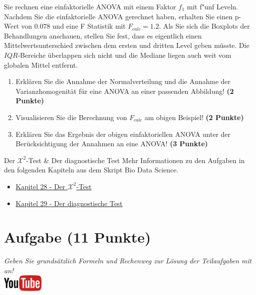 \documentclass[a4paper, 10pt]{scrartcl}\usepackage[]{graphicx}\usepackage[]{xcolor}
\begin{document}
Sie rechnen eine einfaktorielle ANOVA mit einem Faktor $f_1$ mit
f{"u}nf Leveln. Nachdem Sie die einfaktorielle ANOVA gerechnet
haben, erhalten Sie einen p-Wert von $0.078$ und eine F Statistik mit
$F_{calc} = 1.2$. Als Sie sich die Boxplots der Behandlungen anschauen,
stellen Sie fest, dass es eigentlich einen Mittelwertsunterschied zwischen
dem ersten und dritten Level geben m{\"u}sste. Die
$IQR$-Bereiche {\"u}berlappen sich nicht und die Mediane liegen auch weit vom
globalen Mittel entfernt.


\begin{enumerate}
\item Erkl{\"a}ren Sie die Annahme der Normalverteilung und die Annahme der
  Varianzhomogenit{\"a}t f{\"u}r eine ANOVA an einer passenden Abbildung! \textbf{(2 Punkte)}
\item Visualisieren Sie die Berechnung von $F_{calc}$ am obigen Beispiel!
  \textbf{(2 Punkte)}
\item Erkl{\"a}ren Sie das Ergebnis der obigen einfaktoriellen ANOVA unter der
  Ber{\"u}cksichtigung der Annahmen an eine ANOVA! \textbf{(3 Punkte)}
\end{enumerate}

 
\clearpage
  \begin{graybox}{Der $\mathcal{X}^2$-Test \& Der diagnostische Test}
Mehr Informationen zu den Aufgaben in den folgenden Kapiteln aus dem Skript Bio Data Science.
  \begin{itemize}
  \item \href{https://jkruppa.github.io/stat-tests-chi-test.html}{Kapitel 28 - Der $\mathcal{X}^2$-Test}
  \item \href{https://jkruppa.github.io/stat-tests-diagnostic.html}{Kapitel 29 - Der diagnostische Test}
  \end{itemize}
\end{graybox}
\clearpage

\section{Aufgabe \hfill (11 Punkte)}

\textit{Geben Sie grunds{\"a}tzlich Formeln und Rechenweg zur L{\"o}sung der
  Teilaufgaben mit an!} \\[1Ex]

\hfill\href{https://youtu.be/-Kva5wc5Elw}{\includegraphics[width =
  2cm]{img/youtube}}\\[1Ex]
\end{document}
